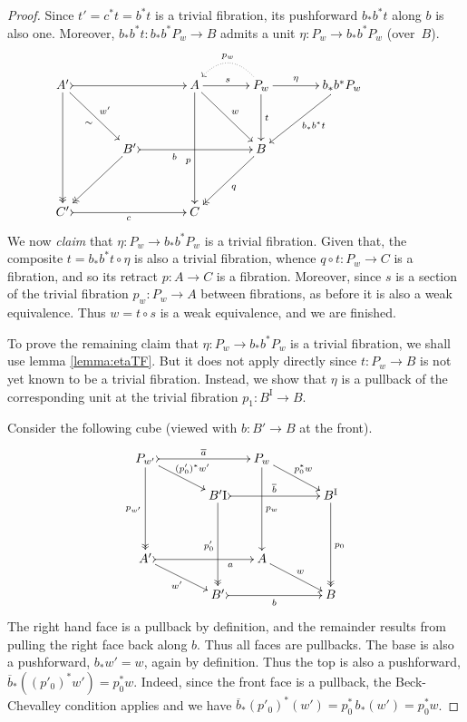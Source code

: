 \documentclass[12pt]{article}
\newcommand{\ra}{\ensuremath{\rightarrow}}
\newcommand{\I}{\ensuremath{\mathrm{I}}}
\theoremstyle{remark}
\theoremstyle{definition}
\begin{document}
\begin{proof}
Since $t' = c^*t = b^*t$ is a trivial fibration, its pushforward $b_*b^*t$ along $b$ is also one.  Moreover, $b_*b^*t : b_*b^*P_w \ra B$ admits a unit $\eta : P_w \ra  b_*b^*P_w$ (over~$B$).  
\begin{equation}\label{diag:EEPfactored3}
\xymatrix@=1.5em{
A' \ar@{->>}[dddd] \ar[rrdd]_{\sim}^{w'} \ar@{>->}[rrrr] && && A \ar[dddd]_>>>>>>>>>>>>p \ar[rrdd]^{w} \ar[rr]^s && \ar@{.>}@/_1.5pc/[ll]_{p_w} P_w \ar[dd]^t \ar[rr]^-\eta && b_*b^*P_w \ar[lldd]^{b_*b^*t}\\
\\
&& B' \ar@{->>}[lldd] \ar@{>->}[rrrr]_<<<<<<<<<<b  &&&& B \ar@{->>}[lldd]^q &&&& \\
\\
C' \ar@{>->}[rrrr]_c &&&& C &&&&
}
\end{equation}
We now \emph{claim} that $\eta : P_w \ra  b_*b^*P_w$ is a trivial fibration.  Given that,  the composite $t = b_*b^*t \circ \eta$ is also a trivial fibration, whence $q\circ t : P_w \ra C$ is a fibration, and so its retract $p:A\ra C$ is a fibration.  Moreover, since $s$ is a section of the trivial fibration $p_w: P_w\ra A$ between fibrations, as before it is also a weak equivalence. Thus $w=t\circ s$ is a weak equivalence, and we are finished. 

To prove the remaining claim that $\eta : P_w \ra  b_*b^*P_w$ is a trivial fibration, we shall use lemma \ref{lemma:etaTF}.  But it does not apply directly since $t : P_w \ra B$ is not yet known to be a trivial fibration.  Instead, we show that $\eta$ is a pullback of the corresponding unit at the trivial fibration $p_1 : B^\I \ra B$.

Consider the following cube (viewed with $b:B'\ra B$ at the front).
\begin{equation}\label{diag:ppcube}
\xymatrix@=1.5em{
P_{w'} \ar@{->>}[ddd]_{p_{w'}} \ar[rrd]^{(p'_0)^*w'} \ar@{>->}[rrr]^{\overline{a}}
		&&& P_w \ar[ddd]^{p_w} \ar[rrd]^{p_0^*w} &&\\
&& B'^\I \ar@{->>}[ddd]_{p'_0} \ar@{>->}[rrr]^{\overline{b}}  
		&&& B^\I \ar@{->>}[ddd]^{p_0} \\
\\
A' \ar@{>->}[rrr]_>>>>>>>a  \ar[rrd]_{w'}
		&&& A \ar[rrd]^{w} &&\\
&& B'\ar@{>->}[rrr]_b &&& B
}
\end{equation}
The right hand face is a pullback by definition, and the remainder results from pulling the right face back along $b$. Thus all faces are pullbacks.  The base is also a pushforward, $b_*w'=w$, again by definition.  Thus the top is also a pushforward, $\overline{b}_*((p'_0)^*w')=p_0^*w$. Indeed, since the front face is a pullback, the Beck-Chevalley condition applies and we have $\overline{b}_*(p'_0)^*(w') = p_0^*\,b_*(w') = p_0^*w$.


\end{proof}
\end{document}
